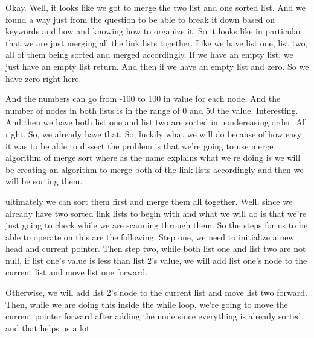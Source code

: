 \expandafter\def\csname sourceexcerpt@44\endcsname{%
Okay. Well, it looks like we got to merge the two list and one sorted list. And we
found a way just from the question to be able to break it down based on keywords and
how and knowing how to organize it. So it looks like in particular that we are just
merging all the link lists together. Like we have list one, list two, all of them
being sorted and merged accordingly. If we have an empty list, we just have an empty
list return. And then if we have an empty list and zero. So we have zero right here.

And the numbers can go from -100 to 100 in value for each node. And the number of
nodes in both lists is in the range of 0 and 50 the value. Interesting. And then we
have both list one and list two are sorted in nondereasing order. All right. So, we
already have that. So, luckily what we will do because of how easy it was to be able
to dissect the problem is that we're going to use merge algorithm of merge sort where
as the name explains what we're doing is we will be creating an algorithm to merge
both of the link lists accordingly and then we will be sorting them.

ultimately we can sort them first and merge them all together. Well, since we already
have two sorted link lists to begin with and what we will do is that we're just going
to check while we are scanning through them. So the steps for us to be able to operate
on this are the following. Step one, we need to initialize a new head and current
pointer. Then step two, while both list one and list two are not null, if list one's
value is less than list 2's value, we will add list one's node to the current list and
move list one forward.

Otherwise, we will add list 2's node to the current list and move list two forward.
Then, while we are doing this inside the while loop, we're going to move the current
pointer forward after adding the node since everything is already sorted and that
helps us a lot.
}

